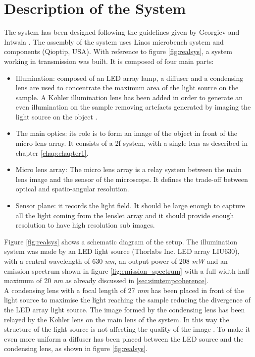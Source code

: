 \section{Description of the System}
The system has been designed following the guidelines given by Georgiev and Intwala \cite{georgiev2006light}. The assembly of the system uses Linos microbench system and components (Qioptip, USA).
With reference to figure \ref{fig:realsys}, a system working in transmission was built. It is composed of four main parts: 
\begin{itemize}
	\item Illumination: composed of an LED array lamp, a diffuser and a condensing lens are used to concentrate the maximum area of the light source on the sample. A K$\ddot{o}$hler illumination lens has been added in order to generate an even illumination on the sample removing artefacts generated by imaging the light source on the object \cite{kohler1893new,kohler1934device}. 
	\item The main optics: its role is to form an image of the object in front of the micro lens array. It consists of a 2f system, with a single lens as described in chapter \ref{chap:chapter1}.
	\item Micro lens array: The micro lens array is a relay system between the main lens image and the sensor of the microscope. It defines the trade-off between optical and spatio-angular resolution.
	\item Sensor plane: it records the light field. It should be large enough to capture all the light coming from the lenslet array and it should provide enough resolution to have high resolution sub images.
\end{itemize}
Figure \ref{fig:realsys} shows a schematic diagram of the setup. The illumination system was made by an LED light source (Thorlabs Inc. LED array LIU630), with a central wavelength of 630 \textit{nm}, an output power of 208 \textit{mW} and an emission spectrum shown in figure \ref{fig:emission_spectrum} with a full width half maximum of 20 \textit{nm} as already discussed in \ref{sec:simtempcoherence}.
\\
A condensing lens with a focal length of 27 \textit{mm} has been placed in front of the light source to maximise the light reaching the sample reducing the divergence of the LED array light source. The image formed by the condensing lens has been relayed by the K$\ddot{o}$hler lens on the main lens of the system. In this way the structure of the light source is not affecting the quality of the image \cite{kohler1893new}. To make it even more uniform a diffuser has been placed between the LED source and the condensing lens, as shown in figure \ref{fig:realsys}.\\
